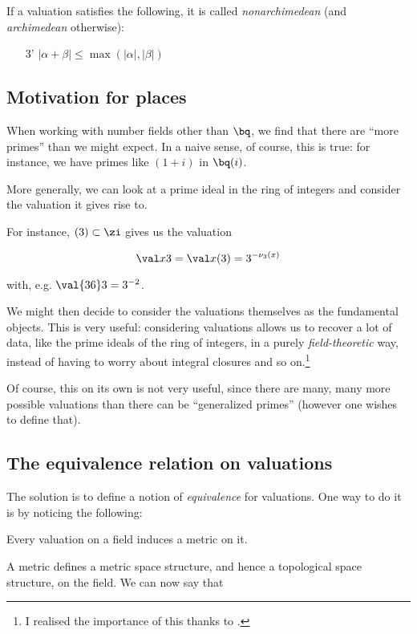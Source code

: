 If a valuation satisfies the following, it is called \textit{nonarchimedean}
(and \textit{archimedean} otherwise):

\begin{enumerate}
\item[3'] $|\alpha + \beta| \leq \max(|\alpha|,|\beta|)$
\end{enumerate}

\subsection{Motivation for places}
\label{sec:whatisaplace}
When working with number fields other than $\bq$, we find that there are ``more
primes'' than we might expect. In a naive sense, of course, this is true: for
instance, we have primes like $(1+i)$ in $\bq(i)$.

More generally, we can look at a prime ideal in the ring of integers and
consider the valuation it gives rise to.


For instance, $(3)\subset\zi$ gives us
the valuation

\[ \val x 3 = \val x {(3)} = 3^{-\nu_3(x)} \]

with, e.g. $ \val {36} 3 = 3^{-2} $.

We might then decide to consider the valuations themselves as the fundamental
objects. This is very useful: considering valuations allows us to recover a lot
of data, like the prime ideals of the ring of integers, in a purely
\textit{field-theoretic} way, instead of having to worry about integral closures
and so on.\footnote{I realised the importance of this thanks to \cite{placemse}.}

Of course, this on its own is not very useful, since there are many,
many more possible valuations than there can be ``generalized primes'' (however one
wishes to define that).

\subsection{The equivalence relation on valuations}

The solution is to define a notion of \textit{equivalence} for valuations. One
way to do it is by noticing the following:

\begin{thm}
  Every valuation on a field induces a metric on it.
\end{thm}

A metric defines a metric space structure, and hence a topological space
structure, on the field. We can now say that

